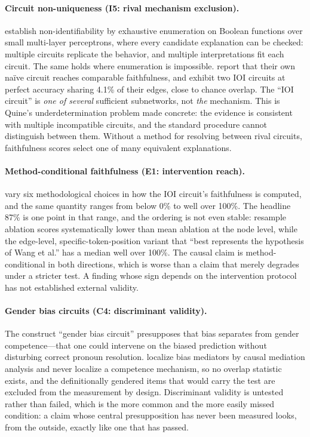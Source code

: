 \documentclass{article}
\begin{document}
\paragraph{Circuit non-uniqueness (I5: rival mechanism exclusion).}
\citet{meloux2025everything} establish non-identifiability by exhaustive enumeration on Boolean functions over small multi-layer perceptrons, where every candidate explanation can be checked: multiple circuits replicate the behavior, and multiple interpretations fit each circuit. The same holds where enumeration is impossible. \citet{wang2023interpretability} report that their own na\"ive circuit reaches comparable faithfulness, and \citet{chen2026circuits} exhibit two IOI circuits at perfect accuracy sharing 4.1\% of their edges, close to chance overlap. The ``IOI circuit'' is \emph{one of several} sufficient subnetworks, not \emph{the} mechanism. This is Quine's underdetermination problem \citep{quine1951two} made concrete: the evidence is consistent with multiple incompatible circuits, and the standard procedure cannot distinguish between them. Without a method for resolving between rival circuits, faithfulness scores select one of many equivalent explanations.

\paragraph{Method-conditional faithfulness (E1: intervention reach).}
\citet{miller2024transformer} vary six methodological choices in how the IOI circuit's faithfulness is computed, and the same quantity ranges from below 0\% to well over 100\%. The headline 87\% is one point in that range, and the ordering is not even stable: resample ablation scores systematically lower than mean ablation at the node level, while the edge-level, specific-token-position variant that ``best represents the hypothesis of Wang et al.'' has a median well over 100\%. The causal claim is method-conditional in both directions, which is worse than a claim that merely degrades under a stricter test. A finding whose sign depends on the intervention protocol has not established external validity.

\paragraph{Gender bias circuits (C4: discriminant validity).}
The construct ``gender bias circuit'' presupposes that bias separates from gender competence---that one could intervene on the biased prediction without disturbing correct pronoun resolution. \citet{vig2020gender} localize bias mediators by causal mediation analysis and never localize a competence mechanism, so no overlap statistic exists, and the definitionally gendered items that would carry the test are excluded from the measurement by design. Discriminant validity is untested rather than failed, which is the more common and the more easily missed condition: a claim whose central presupposition has never been measured looks, from the outside, exactly like one that has passed.
\end{document}
